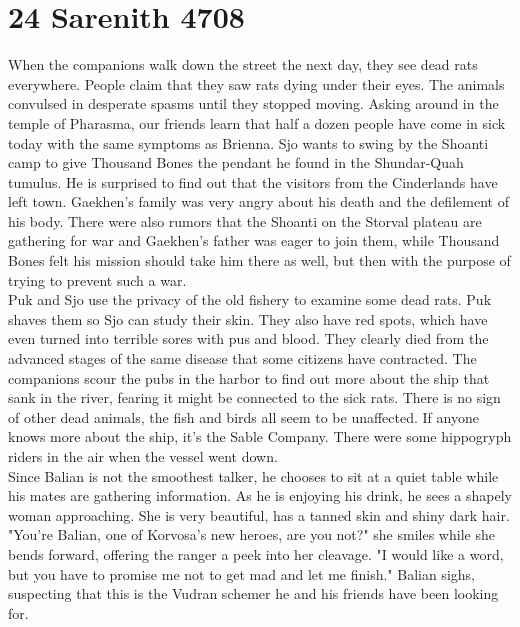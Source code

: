 \section{24 Sarenith 4708}

When the companions walk down the street the next day, they see dead rats everywhere. People claim that they saw rats dying under their eyes. The animals convulsed in desperate spasms until they stopped moving. Asking around in the temple of Pharasma, our friends learn that half a dozen people have come in sick today with the same symptoms as Brienna. Sjo wants to swing by the Shoanti camp to give Thousand Bones the pendant he found in the Shundar-Quah tumulus. He is surprised to find out that the visitors from the Cinderlands have left town. Gaekhen's family was very angry about his death and the defilement of his body. There were also rumors that the Shoanti on the Storval plateau are gathering for war and Gaekhen's father was eager to join them, while Thousand Bones felt his mission should take him there as well, but then with the purpose of trying to prevent such a war.\\

Puk and Sjo use the privacy of the old fishery to examine some dead rats. Puk shaves them so Sjo can study their skin. They also have red spots, which have even turned into terrible sores with pus and blood. They clearly died from the advanced stages of the same disease that some citizens have contracted. The companions scour the pubs in the harbor to find out more about the ship that sank in the river, fearing it might be connected to the sick rats. There is no sign of other dead animals, the fish and birds all seem to be unaffected. If anyone knows more about the ship, it's the Sable Company. There were some hippogryph riders in the air when the vessel went down.\\

Since Balian is not the smoothest talker, he chooses to sit at a quiet table while his mates are gathering information. As he is enjoying his drink, he sees a shapely woman approaching. She is very beautiful, has a tanned skin and shiny dark hair. "You're Balian, one of Korvosa's new heroes, are you not?" she smiles while she bends forward, offering the ranger a peek into her cleavage. "I would like a word, but you have to promise me not to get mad and let me finish." Balian sighs, suspecting that this is the Vudran schemer he and his friends have been looking for.\\

